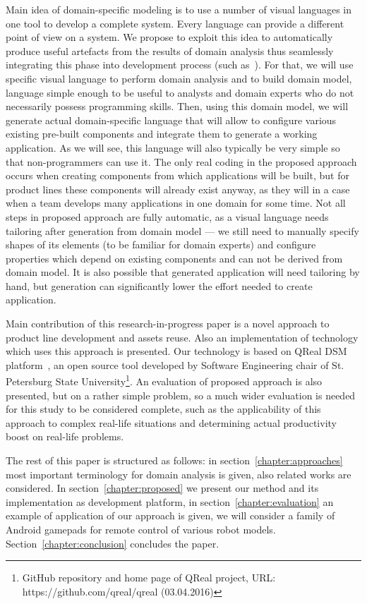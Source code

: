 \documentclass[conference]{IEEEtran}
\begin{document}
Main idea of domain-specific modeling is to use a number of visual languages in one tool to develop a complete system. Every language can provide a different point of view on a system. We propose to exploit this idea to automatically produce useful artefacts from the results of domain analysis thus seamlessly integrating this phase into development process (such as~\cite{koznov2011process}). For that, we will use specific visual language to perform domain analysis and to build domain model, language simple enough to be useful to analysts and domain experts who do not necessarily possess programming skills. Then, using this domain model, we will generate actual domain-specific language that will allow to configure various existing pre-built components and integrate them to generate a working application. As we will see, this language will also typically be very simple so that non-programmers can use it. The only real coding in the proposed approach occurs when creating components from which applications will be built, but for product lines these components will already exist anyway, as they will in a case when a team develops many applications in one domain for some time. Not all steps in proposed approach are fully automatic, as a visual language needs tailoring after generation from domain model --- we still need to manually specify shapes of its elements (to be familiar for domain experts) and configure properties which depend on existing components and can not be derived from domain model. It is also possible that generated application will need tailoring by hand, but generation can significantly lower the effort needed to create application.

Main contribution of this research-in-progress paper is a novel approach to product line development and assets reuse. Also an implementation of technology which uses this approach is presented. Our technology is based on QReal DSM platform~\cite{kuzenkova2013qreal}, an open source tool developed by Software Engineering chair of St. Petersburg State University\footnote{GitHub repository and home page of QReal project, URL: https://github.com/qreal/qreal (03.04.2016)}. An evaluation of proposed approach is also presented, but on a rather simple problem, so a much wider evaluation is needed for this study to be considered complete, such as the applicability of this approach to complex real-life situations and determining actual productivity boost on real-life problems.

The rest of this paper is structured as follows: in section~\ref{chapter:approaches} most important terminology for domain analysis is given, also related works are considered. In section~\ref{chapter:proposed} we present our method and its implementation as development platform, in section~\ref{chapter:evaluation} an example of application of our approach is given, we will consider a family of Android gamepads for remote control of various robot models. Section~\ref{chapter:conclusion} concludes the paper.
\end{document}

